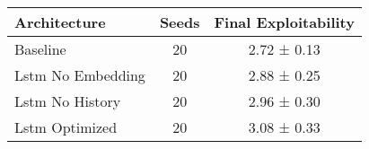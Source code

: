 \begin{tabular}{lcc}
\toprule
Architecture & Seeds & Final Exploitability \\
\midrule
Baseline & 20 & 2.72 ± 0.13 \\
Lstm No Embedding & 20 & 2.88 ± 0.25 \\
Lstm No History & 20 & 2.96 ± 0.30 \\
Lstm Optimized & 20 & 3.08 ± 0.33 \\
\bottomrule
\end{tabular}
